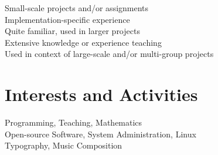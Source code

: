 \documentclass[a4paper,10pt]{article}
\begin{document}
\vspace{1em}

\begin{center}
  \parbox{12cm}{
    \onenote Small-scale projects and/or assignments \\
    \twonotes Implementation-specific experience \\
    \threenotes Quite familiar, used in larger projects \\
    \fournotes Extensive knowledge or experience teaching \\
    \fivenotes Used in context of large-scale and/or multi-group projects}
\end{center}

\vspace{1em}

\section{Interests and Activities}
Programming, Teaching, Mathematics\\
Open-source Software, System Administration, Linux\\
Typography, Music Composition

\end{document}
